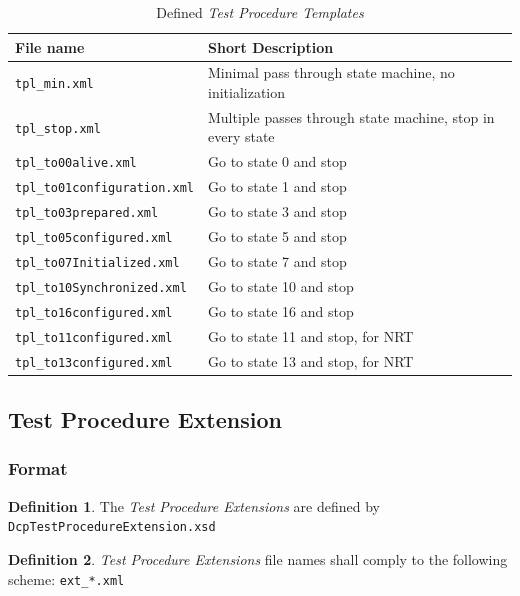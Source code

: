 \documentclass[a4paper]{scrartcl}
\theoremstyle{definition}
\newtheorem*{Def}{Definition}
\begin{document}
\begin{table}[H]
	\centering
		\begin{tabular}{ll}
		File name & Short Description \\ \hline
		\texttt{tpl\_min.xml}	&	Minimal pass through state machine, no initialization \\
		\texttt{tpl\_stop.xml}	&	Multiple passes through state machine, stop in every state \\
		\texttt{tpl\_to00alive.xml}	& Go to state 0 and stop \\
		\texttt{tpl\_to01configuration.xml} & Go to state 1 and stop \\
		\texttt{tpl\_to03prepared.xml}	& Go to state 3 and stop \\
		\texttt{tpl\_to05configured.xml}	& Go to state 5 and stop \\
		\texttt{tpl\_to07Initialized.xml}	& Go to state 7 and stop \\
		\texttt{tpl\_to10Synchronized.xml}	& Go to state 10 and stop \\
		\texttt{tpl\_to16configured.xml}	& Go to state 16 and stop \\
		\texttt{tpl\_to11configured.xml}	& Go to state 11 and stop, for NRT \\
		\texttt{tpl\_to13configured.xml}	& Go to state 13 and stop, for NRT \\
		\end{tabular}
	\caption{Defined \textit{Test Procedure Templates}}
	\label{tab:TestProcedureTemplates}
\end{table}

\subsection{Test Procedure Extension}
\label{sec:extensions:test_procedure_extension}

\subsubsection{Format}

\begin{Def}
The \textit{Test Procedure Extensions} are defined by \texttt{DcpTestProcedureExtension.xsd}
\end{Def}

\begin{Def}
\textit{Test Procedure Extensions} file names shall comply to the following scheme: \texttt{ext\_*.xml}
\end{Def}
\end{document}
